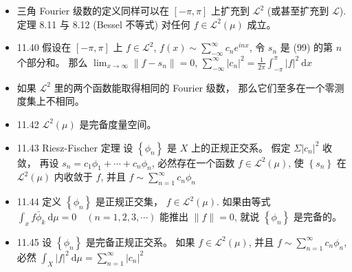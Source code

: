 \begin{itemize}
\item 三角 Fourier 级数的定义同样可以在 $[-\pi, \pi]$ 上扩充到 $\mathscr{L}^{2}$ (或甚至扩充到 $\mathscr{L}$). 定理 8.11 与 8.12 (Bessel 不等式) 对任何 $f \in \mathscr{L}^{2}(\mu)$ 成立。

\item 11.40 假设在 $[-\pi, \pi]$ 上 $f \in \mathscr{L}^{2}$, $f(x) \sim \sum_{-\infty}^{\infty} c_{n} e^{i n x}$, 令 $s_{n}$ 是 (99) 的第 $n$ 个部分和。 那么 $\lim _{x \rightarrow \infty}\left\|f-s_{n}\right\|=0$, $\sum_{-\infty}^{\infty}\left|c_{n}\right|^{2}=\frac{1}{2 \pi} \int_{-\pi}^{\pi}|f|^{2} \mathrm{~d} x$

\item 如果 $\mathscr{L}^{2}$ 里的两个函数能取得相同的 Fourier 级数， 那么它们至多在一个零测度集上不相同。

\item 11.42 $\mathscr{L}^{2}(\mu)$ 是完备度量空间。

\item 11.43 Riesz-Fischer 定理 设 $\left\{\phi_{n}\right\}$ 是 $X$ 上的正规正交系。 假定 $\Sigma\left|c_{n}\right|^{2}$ 收敛， 再设 $s_{n}=c_{1} \phi_{1}+\cdots+c_{n} \phi_{n}$, 必然存在一个函数 $f \in \mathscr{L}^{2}(\mu)$, 使 $\left\{s_{n}\right\}$ 在 $\mathscr{L}^{2}(\mu)$ 内收敛于 $f$, 并且 $f \sim \sum_{n=1}^{\infty} {c}_{n} \phi_{n}$

\item 11.44 定义 $\left\{\phi_{n}\right\}$ 是正规正交集， $f \in \mathscr{L}^{2}(\mu)$. 如果由等式 $\int_{x} f \bar{\phi}_{k} \mathrm{~d} \mu=0 \quad(n=1,2,3, \cdots)$ 能推出 $\|f\|=0$, 就说 $\left\{\phi_{n}\right\}$ 是完备的。

\item 11.45 设 $\left\{\phi_{n}\right\}$ 是完备正规正交系。 如果 $f \in \mathscr{L}^{2}(\mu)$, 并且 $f \sim \sum_{n=1}^{\infty} c_{n} \phi_{n}$, 必然 $\int_{X}|f|^{2} \mathrm{~d} \mu=\sum_{n=1}^{\infty}\left|c_{n}\right|^{2}$

\end{itemize}
